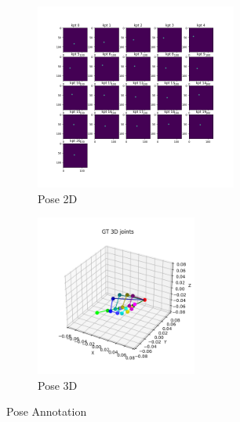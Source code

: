 \begin{figure}[ht]
    \begin{center}
        \begin{subfigure}[b]{0.5\textwidth}
            \includegraphics[width=250px]{assets/hand_heatmap_annotation.png}
            \caption{Pose 2D}
            \label{fig:hand_heatmap_annotation}
        \end{subfigure}
        \begin{subfigure}[b]{0.45\textwidth}
            \includegraphics[width=200px]{assets/hand_pose_annotation.png}
            \caption{Pose 3D}
            \label{fig:hand_pose_annotation}
        \end{subfigure}
	    \caption{Pose Annotation}
	    \label{fig:hand_annnotation}        
    \end{center}
\end{figure}

